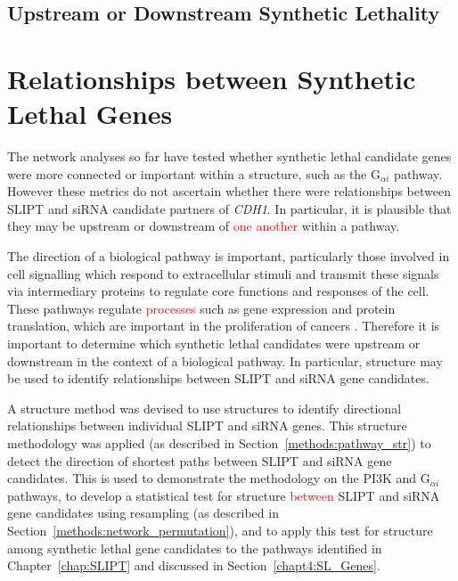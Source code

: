 \FloatBarrier

\subsection{Upstream or Downstream Synthetic Lethality}
\fi

\FloatBarrier

\section{Relationships between Synthetic Lethal Genes}

The network analyses so far have tested whether \gls{synthetic lethal} candidate genes were more connected or important within a  structure, such as the G$_{\alpha i}$ \gls{pathway}. However these metrics do not ascertain whether there were relationships between \gls{SLIPT} and \gls{siRNA} candidate partners of \textit{CDH1}. In particular, it is plausible that they may be upstream or downstream of \textcolor{red}{one another} within a \gls{pathway}.

The direction of a biological \gls{pathway} is important, particularly those involved in cell signalling which respond to extracellular stimuli and transmit these signals via intermediary proteins to regulate core functions and responses of the cell. These \glspl{pathway} regulate \textcolor{red}{processes} such as \gls{gene expression} and protein translation, which are important in the proliferation of cancers \citep{Gao2015}. Therefore it is important to determine which \gls{synthetic lethal} candidates were upstream or downstream in the context of a biological \gls{pathway}. In particular,  structure may be used to identify relationships between \gls{SLIPT} and \gls{siRNA} gene candidates.

A  structure method was devised to use  structures to identify directional relationships between individual \gls{SLIPT} and \gls{siRNA} genes. This  structure methodology was applied (as described in Section~\ref{methods:pathway_str}) to detect the direction of \glspl{shortest path} between \gls{SLIPT} and \gls{siRNA} gene candidates. This is used to demonstrate the methodology on the PI3K and G$_{\alpha i}$ \glspl{pathway}, to develop a statistical test for  structure \textcolor{red}{between} \gls{SLIPT} and \gls{siRNA} gene candidates using resampling  (as described in Section~\ref{methods:network_permutation}), and to apply this test for  structure among \gls{synthetic lethal} gene candidates to the \glspl{pathway} identified in Chapter~\ref{chap:SLIPT} and discussed in Section~\ref{chapt4:SL_Genes}.

